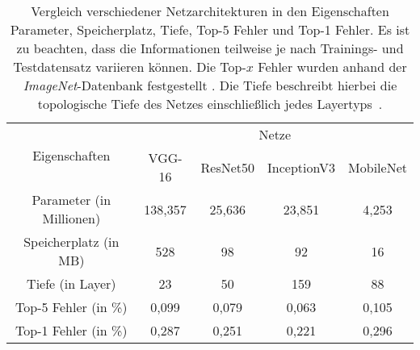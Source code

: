 \begin{table}[H]
	\caption{Vergleich verschiedener Netzarchitekturen in den Eigenschaften Parameter, Speicherplatz, Tiefe, Top-5 Fehler und Top-1 Fehler. Es ist zu beachten, dass die Informationen teilweise je nach Trainings- und Testdatensatz variieren können. Die Top-$x$ Fehler wurden anhand der \textit{ImageNet}-Datenbank festgestellt \cite{keras}. Die Tiefe beschreibt hierbei die topologische Tiefe des Netzes einschließlich jedes Layertyps~\cite{keras}.}
	\begin{center}
		\begin{tabular}{|c|c|c|c|c|}
			\hline
			\multirow{2}{*}{Eigenschaften}& \multicolumn{4}{c|}{\centering Netze} \\
			\cline{2-5} & \multicolumn{1}{c|}{VGG-16} & \multicolumn{1}{c|}{ResNet50} & \multicolumn{1}{c|}{InceptionV3} & \multicolumn{1}{c|}{MobileNet} \\ \hline
			Parameter (in Millionen)	& 138,357 	& 25,636 	& 23,851 	& 4,253 \\
			Speicherplatz (in MB)		& 528 		& 98 		& 92 		& 16 \\
			Tiefe (in Layer) 			& 23 		& 50			& 159 		& 88 \\
			Top-5 Fehler (in \%)	& 0,099 	& 0,079 	& 0,063		& 0,105 \\
			Top-1 Fehler (in \%) 	& 0,287 	& 0,251 	& 0,221		& 0,296 \\
			\hline
		\end{tabular}
	\end{center}

	\label{fig: cnnvergleich}
\end{table}